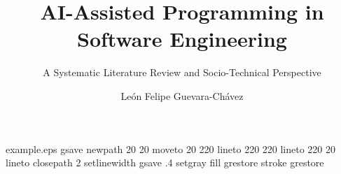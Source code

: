 %
%
%
%
%
\begin{filecontents*}{example.eps}
gsave
newpath
  20 20 moveto
  20 220 lineto
  220 220 lineto
  220 20 lineto
closepath
2 setlinewidth
gsave
  .4 setgray fill
grestore
stroke
grestore
\end{filecontents*}
%
\RequirePackage{fix-cm}
%
\documentclass{svjour3}                     %
%
\smartqed  %
%
\usepackage{graphicx}
\usepackage{url}
\usepackage{microtype}
%
%
%
%
%



\title{AI-Assisted Programming in Software Engineering}
\subtitle{A Systematic Literature Review and Socio-Technical Perspective}


\author{León Felipe Guevara-Chávez}



